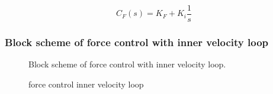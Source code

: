 \documentclass{article}
\begin{document}
\begin{equation}
    C_F(s) = K_F + K_i \frac{1}{s}
\end{equation}






\subsubsection{Block scheme of force control with inner velocity loop}
\begin{figure}[H]
    \centering
    \caption{Block scheme of force control with inner velocity loop.}
    \label{fig:Block scheme of force control with inner velocity loop.}
\end{figure}


\begin{figure}[H]
    \centering
    \caption{force control inner velocity loop}
    \label{fig:force_control_inner_velocity_graph}
\end{figure}
\end{document}
